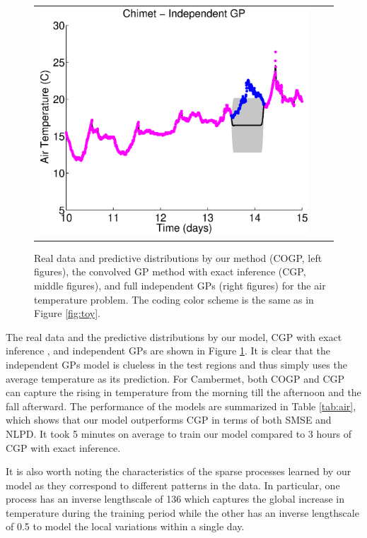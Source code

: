 \begin{figure}
\begin{tabular}{ccc}
\includegraphics[scale=0.3]{figures/weatherChimet.eps}
\end{tabular}
\caption{Real data and predictive distributions by our method (COGP, left figures), the convolved GP method with exact inference (CGP, middle figures), and full independent GPs (right figures) for the air temperature problem. The coding color scheme is the same as in Figure \ref{fig:toy}.}
\label{fig:weather}
\end{figure}

The real data and the predictive distributions by our model, CGP with exact inference \citep{alvarez-lawrence-nips-08}, and independent GPs are shown in Figure \ref{fig:weather}.
It is clear that the independent GPs model is clueless in the test regions and thus simply uses the average temperature as its prediction.
For Cambermet, both COGP and CGP can capture the rising in temperature from the morning till the afternoon and the fall afterward.
The  performance of the models are summarized in Table \ref{tab:air},  which shows that our model outperforms CGP in terms of both SMSE and NLPD.
It took 5 minutes on average to train our model compared to 3 hours of CGP with exact inference.

It is also worth noting the characteristics of the sparse processes learned by our model as they  correspond to different patterns in the data.
In particular, one process has an inverse lengthscale of 136 which captures the global increase in temperature during the training period while the other has an inverse lengthscale of 0.5 to model the local variations within a single day.

